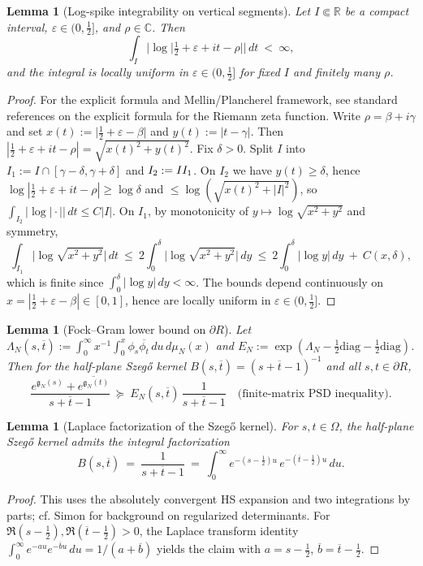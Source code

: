 \documentclass[11pt]{article}
\newtheorem{lemma}[theorem]{Lemma}
\theoremstyle{definition}
\theoremstyle{remark}
\newcommand{\C}{\mathbb{C}}
\newcommand{\R}{\mathbb{R}}
\begin{document}
\begin{lemma}[Log-spike integrability on vertical segments]\label{lem:log-spike-int}
Let $I\Subset\R$ be a compact interval, $\varepsilon\in(0,\tfrac12]$, and $\rho\in\C$. Then
\[
 \int_I \big|\log\big|\tfrac12+\varepsilon+it-\rho\big|\big|\,dt\ <\ \infty,
\]
and the integral is locally uniform in $\varepsilon\in(0,\tfrac12]$ for fixed $I$ and finitely many $\rho$.
\end{lemma}
\begin{proof}
For the explicit formula and Mellin/Plancherel framework, see standard references on the explicit formula for the Riemann zeta function.
Write $\rho=\beta+i\gamma$ and set $x(t):=\big|\tfrac12+\varepsilon-\beta\big|$ and $y(t):=|t-\gamma|$. Then $|\tfrac12+\varepsilon+it-\rho|=\sqrt{x(t)^2+y(t)^2}$. Fix $\delta>0$. Split $I$ into $I_1:=I\cap[\gamma-\delta,\gamma+\delta]$ and $I_2:=I\\I_1$. On $I_2$ we have $y(t)\ge \delta$, hence $\log|\tfrac12+\varepsilon+it-\rho|\ge \log\delta$ and $\le \log(\sqrt{x(t)^2+|I|^2})$, so $\int_{I_2}|\log|\cdot||\,dt\le C|I|$. On $I_1$, by monotonicity of $y\mapsto \log\sqrt{x^2+y^2}$ and symmetry,
\[
 \int_{I_1}\!\big|\log\sqrt{x^2+y^2}\big|\,dt\ \le\ 2\int_0^{\delta} \big|\log\sqrt{x^2+y^2}\big|\,dy\ \le\ 2\int_0^{\delta} \big|\log y\big|\,dy\ +\ C(x,\delta),
\]
which is finite since $\int_0^{\delta}|\log y|\,dy<\infty$. The bounds depend continuously on $x=|\tfrac12+\varepsilon-\beta|\in[0,1]$, hence are locally uniform in $\varepsilon\in(0,\tfrac12]$.
\end{proof}
\begin{lemma}[Fock–Gram lower bound on \(\partial R\)]\label{lem:fock-gram-formal}
Let \(\Lambda_N(s,\overline t):=\int_0^\infty x^{-1}\int_0^x \phi_s\overline{\phi_t}\,du\,d\mu_N(x)\) and \(E_N:=\exp(\Lambda_N-\tfrac12\mathrm{diag}-\tfrac12\mathrm{diag})\). Then for the half-plane Szeg\H{o} kernel \(B(s,\overline t)=(s+\overline t-1)^{-1}\) and all \(s,t\in\partial R\),
\[\frac{e^{\mathfrak g_N(s)}+\overline{e^{\mathfrak g_N(t)}}}{s+\overline t-1}\ \succeq\ E_N(s,\overline t)\,\frac{1}{s+\overline t-1}\quad\text{(finite-matrix PSD inequality).}\]
\end{lemma}
\begin{lemma}[Laplace factorization of the Szeg\H{o} kernel]\label{lem:laplace-szego}
For \(s,t\in\Omega\), the half-plane Szeg\H{o} kernel admits the integral factorization
\[
 B(s,\overline t)\ =\ \frac{1}{s+\overline t-1}\ =\ \int_{0}^{\infty} e^{-(s-\tfrac12)u}\,e^{-(\overline t-\tfrac12)u}\,du.
\]
\end{lemma}
\begin{proof}
This uses the absolutely convergent HS expansion and two integrations by parts; cf. Simon \cite[§9]{SimonTraceIdeals} for background on regularized determinants.
For \(\Re(s-\tfrac12),\Re(\overline t-\tfrac12)>0\), the Laplace transform identity \(\int_0^\infty e^{-au}e^{-\overline bu}\,du=1/(a+\overline b)\) yields the claim with \(a=s-\tfrac12\), \(\overline b=\overline t-\tfrac12\).
\end{proof}
\end{document}
